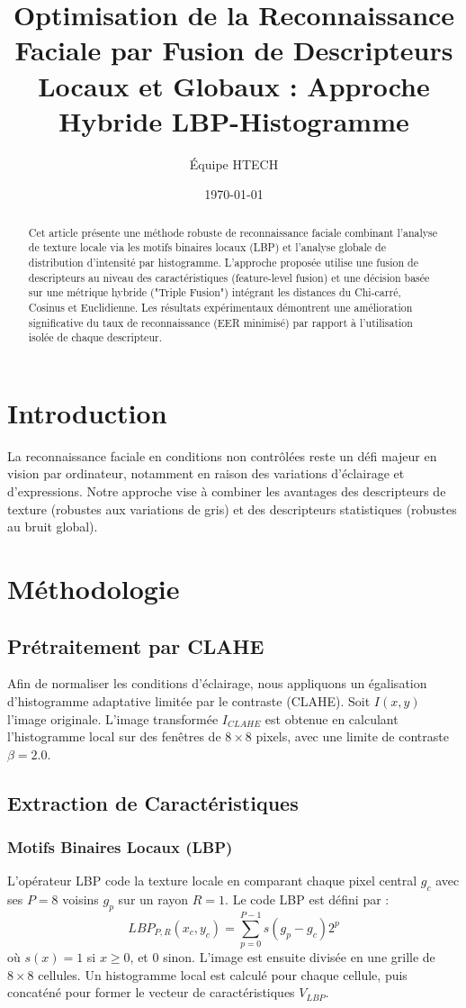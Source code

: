 \documentclass[a4paper,12pt]{article}
\title{\textbf{Optimisation de la Reconnaissance Faciale par Fusion de Descripteurs Locaux et Globaux : Approche Hybride LBP-Histogramme}}
\author{Équipe HTECH}
\date{\today}
\begin{document}
\maketitle

\begin{abstract}
Cet article présente une méthode robuste de reconnaissance faciale combinant l'analyse de texture locale via les motifs binaires locaux (LBP) et l'analyse globale de distribution d'intensité par histogramme. L'approche proposée utilise une fusion de descripteurs au niveau des caractéristiques (feature-level fusion) et une décision basée sur une métrique hybride ("Triple Fusion") intégrant les distances du Chi-carré, Cosinus et Euclidienne. Les résultats expérimentaux démontrent une amélioration significative du taux de reconnaissance (EER minimisé) par rapport à l'utilisation isolée de chaque descripteur.
\end{abstract}

\section{Introduction}
La reconnaissance faciale en conditions non contrôlées reste un défi majeur en vision par ordinateur, notamment en raison des variations d'éclairage et d'expressions. Notre approche vise à combiner les avantages des descripteurs de texture (robustes aux variations de gris) et des descripteurs statistiques (robustes au bruit global).

\section{Méthodologie}

\subsection{Prétraitement par CLAHE}
Afin de normaliser les conditions d'éclairage, nous appliquons un égalisation d'histogramme adaptative limitée par le contraste (CLAHE).
Soit $I(x,y)$ l'image originale. L'image transformée $I_{CLAHE}$ est obtenue en calculant l'histogramme local sur des fenêtres de $8 \times 8$ pixels, avec une limite de contraste $\beta = 2.0$.

\subsection{Extraction de Caractéristiques}

\subsubsection{Motifs Binaires Locaux (LBP)}
L'opérateur LBP code la texture locale en comparant chaque pixel central $g_c$ avec ses $P=8$ voisins $g_p$ sur un rayon $R=1$. Le code LBP est défini par :
\begin{equation}
LBP_{P,R}(x_c, y_c) = \sum_{p=0}^{P-1} s(g_p - g_c) 2^p
\end{equation}
où $s(x) = 1$ si $x \ge 0$, et $0$ sinon.
L'image est ensuite divisée en une grille de $8 \times 8$ cellules. Un histogramme local est calculé pour chaque cellule, puis concaténé pour former le vecteur de caractéristiques $V_{LBP}$.
\end{document}
